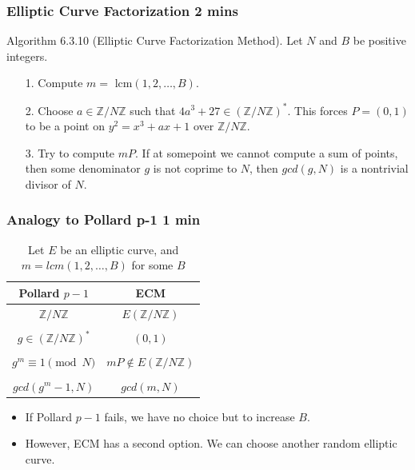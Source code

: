 \documentclass{beamer}
\begin{document}
\begin{frame}
\frametitle{Elliptic Curve Factorization 2 mins}
Algorithm 6.3.10 (Elliptic Curve Factorization Method). Let $N$ and $B$ be positive integers.
\begin{itemize}
\item[1.] Compute $m =$ lcm$(1,2,\ldots, B)$. 
\item[2.] Choose $a \in \mathbb{Z}/N\mathbb{Z}$ such that $4a^3 + 27 \in \left(\mathbb{Z}/N\mathbb{Z}\right)^*$. This forces $P = (0,1)$ to be a point on $y^2 = x^3 + ax +1$ over $\mathbb{Z}/N\mathbb{Z}$. 
\item[3.] Try to compute $mP$. If at somepoint we cannot compute a sum of points, then some denominator $g$ is not coprime to $N$, then $gcd(g,N)$ is a nontrivial divisor of $N$.
\end{itemize}
\end{frame}

\begin{frame}
\frametitle{Analogy to Pollard p-1 1 min}
\begin{table}[h!]
  \begin{center}
    \caption{Let $E$ be an elliptic curve, and $m = lcm(1,2,\ldots,B)$ for some $B$}
    \label{tab:table1}
    \begin{tabular}{|c|c|} %
      \textbf{Pollard $p-1$} & \textbf{ECM} \\
      \hline
      $\mathbb{Z}/N\mathbb{Z}$ & $E\left( \mathbb{Z}/N\mathbb{Z} \right)$\\ &\\
      $g \in (\mathbb{Z}/N\mathbb{Z})^*$ & $(0,1)$ \\ & \\
      $g^m \equiv 1 \pmod{N}$ & $mP \notin E\left( \mathbb{Z}/N\mathbb{Z} \right)$ \\ &\\
      $gcd(g^m-1, N)$ & $gcd(m,N)$
    \end{tabular}
  \end{center}
\end{table}

\begin{itemize}
\item If Pollard $p-1$ fails, we have no choice but to increase $B$. 
\item However, ECM has a second option. We can choose another random elliptic curve. 
\end{itemize}
\end{frame}
\end{document}
